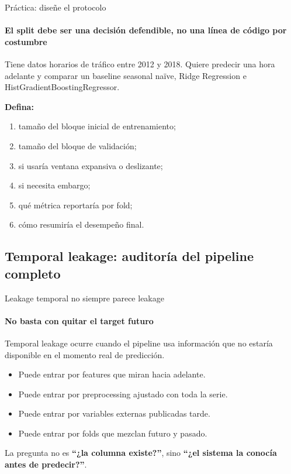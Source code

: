 \documentclass[aspectratio=169,11pt]{beamer}  %
\newcommand{\Lg}{\fontsize{16}{20}\selectfont}
\newcommand{\bigstate}[1]{\begin{center}\Lg #1\end{center}}
\begin{document}
\begin{frame}{Práctica: diseñe el protocolo}
\framesubtitle{El split debe ser una decisión defendible, no una línea de código por costumbre}
\begin{taskbox}
Tiene datos horarios de tráfico entre 2012 y 2018. Quiere predecir una hora adelante y comparar un baseline seasonal naïve, Ridge Regression e HistGradientBoostingRegressor.
\end{taskbox}
\textbf{Defina:}
\begin{enumerate}
\item tamaño del bloque inicial de entrenamiento;
\item tamaño del bloque de validación;
\item si usaría ventana expansiva o deslizante;
\item si necesita embargo;
\item qué métrica reportaría por fold;
\item cómo resumiría el desempeño final.
\end{enumerate}
\end{frame}

\subsection{Temporal leakage: auditoría del pipeline completo}

\begin{frame}{Leakage temporal no siempre parece leakage}
\framesubtitle{No basta con quitar el target futuro}
\bigstate{Temporal leakage ocurre cuando el pipeline usa información que no estaría disponible en el momento real de predicción.}
\begin{itemize}\small
\item Puede entrar por features que miran hacia adelante.
\item Puede entrar por preprocessing ajustado con toda la serie.
\item Puede entrar por variables externas publicadas tarde.
\item Puede entrar por folds que mezclan futuro y pasado.
\end{itemize}
\begin{center}
La pregunta no es \textbf{``¿la columna existe?''}, sino \textbf{``¿el sistema la conocía antes de predecir?''}.
\end{center}
\end{frame}
\end{document}
